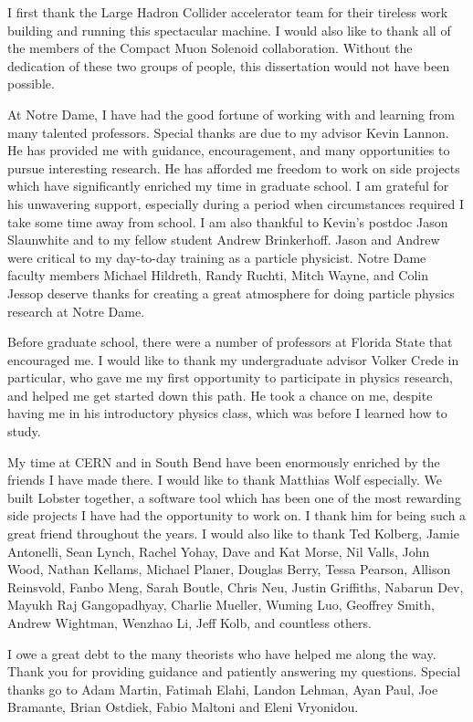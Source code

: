 \documentclass[noinfo,final,nonatbib]{nddiss2e}
\begin{document}
\begin{acknowledge}
I first thank the Large Hadron Collider accelerator team for their tireless work
building and running this spectacular machine. I would also like to thank all of
the members of the Compact Muon Solenoid collaboration. Without the dedication
of these two groups of people, this dissertation would not have been possible.

At Notre Dame, I have had the good fortune of working with and learning from
many talented professors. Special thanks are due to my advisor Kevin Lannon. He
has provided me with guidance, encouragement, and many opportunities to pursue
interesting research. He has afforded me freedom to work on side projects which
have significantly enriched my time in graduate school. I am grateful for his
unwavering support, especially during a period when circumstances required I
take some time away from school. I am also thankful to Kevin's postdoc Jason
Slaunwhite and to my fellow student Andrew Brinkerhoff. Jason and Andrew were
critical to my day-to-day training as a particle physicist. Notre Dame faculty
members Michael Hildreth, Randy Ruchti, Mitch Wayne, and Colin Jessop deserve
thanks for creating a great atmosphere for doing particle physics research at
Notre Dame.

Before graduate school, there were a number of professors at Florida State that
encouraged me. I would like to thank my undergraduate advisor Volker Crede in
particular, who gave me my first opportunity to participate in physics research,
and helped me get started down this path. He took a chance on me, despite having
me in his introductory physics class, which was before I learned how to study.

My time at CERN and in South Bend have been enormously enriched by the friends I
have made there. I would like to thank Matthias Wolf especially. We built
Lobster together, a software tool which has been one of the most rewarding side
projects I have had the opportunity to work on. I thank him for being such a
great friend throughout the years. I would also like to thank Ted Kolberg, Jamie
Antonelli, Sean Lynch, Rachel Yohay, Dave and Kat Morse, Nil Valls, John Wood,
Nathan Kellams, Michael Planer, Douglas Berry, Tessa Pearson, Allison Reinsvold,
Fanbo Meng, Sarah Boutle, Chris Neu, Justin Griffiths, Nabarun Dev, Mayukh Raj
Gangopadhyay, Charlie Mueller, Wuming Luo, Geoffrey Smith, Andrew Wightman,
Wenzhao Li, Jeff Kolb, and countless others.

I owe a great debt to the many theorists who have helped me along the way. Thank
you for providing guidance and patiently answering my questions. Special thanks
go to Adam Martin, Fatimah Elahi, Landon Lehman, Ayan Paul, Joe Bramante, Brian
Ostdiek, Fabio Maltoni and Eleni Vryonidou.


\end{acknowledge}
\end{document}
